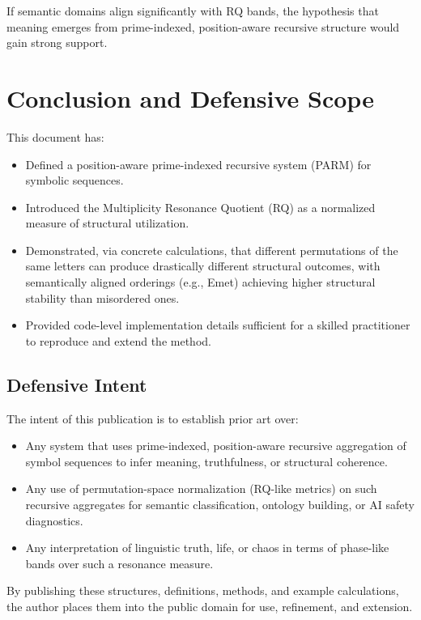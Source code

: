 \documentclass[11pt]{article}
\begin{document}
If semantic domains align significantly with RQ bands, the hypothesis that meaning emerges from prime-indexed, position-aware recursive structure would gain strong support.

\section{Conclusion and Defensive Scope}

This document has:
\begin{itemize}
    \item Defined a position-aware prime-indexed recursive system (PARM) for symbolic sequences.
    \item Introduced the Multiplicity Resonance Quotient (RQ) as a normalized measure of structural utilization.
    \item Demonstrated, via concrete calculations, that different permutations of the same letters can produce drastically different structural outcomes, with semantically aligned orderings (e.g., Emet) achieving higher structural stability than misordered ones.
    \item Provided code-level implementation details sufficient for a skilled practitioner to reproduce and extend the method.
\end{itemize}

\subsection*{Defensive Intent}

The intent of this publication is to establish prior art over:
\begin{itemize}
    \item Any system that uses prime-indexed, position-aware recursive aggregation of symbol sequences to infer meaning, truthfulness, or structural coherence.
    \item Any use of permutation-space normalization (RQ-like metrics) on such recursive aggregates for semantic classification, ontology building, or AI safety diagnostics.
    \item Any interpretation of linguistic truth, life, or chaos in terms of phase-like bands over such a resonance measure.
\end{itemize}

By publishing these structures, definitions, methods, and example calculations, the author places them into the public domain for use, refinement, and extension.
\end{document}
